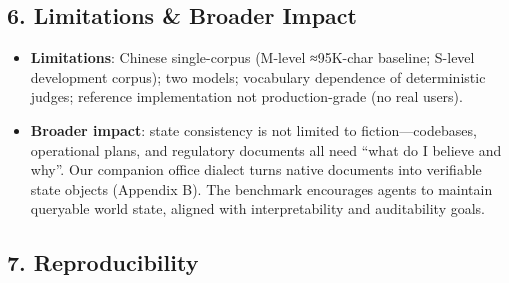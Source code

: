 \documentclass[
  english,
]{article}
\providecommand{\tightlist}{%
  \setlength{\itemsep}{0pt}\setlength{\parskip}{0pt}}
\begin{document}
\subsection{6. Limitations \& Broader
Impact}\label{limitations-broader-impact}

\begin{itemize}
\tightlist
\item
  \textbf{Limitations}: Chinese single-corpus (M-level ≈95K-char
  baseline; S-level development corpus); two models; vocabulary
  dependence of deterministic judges; reference implementation not
  production-grade (no real users).
\item
  \textbf{Broader impact}: state consistency is not limited to
  fiction---codebases, operational plans, and regulatory documents all
  need ``what do I believe and why''. Our companion office dialect turns
  native documents into verifiable state objects (Appendix B). The
  benchmark encourages agents to maintain queryable world state, aligned
  with interpretability and auditability goals.
\end{itemize}

\subsection{7. Reproducibility}\label{reproducibility}
\end{document}
